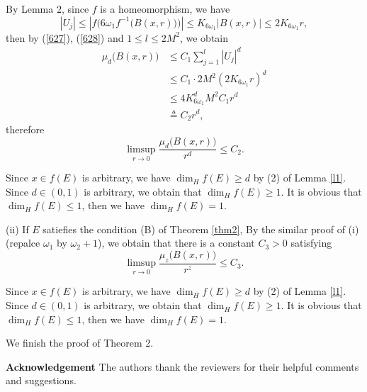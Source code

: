 \documentclass[reqno]{amsart}
\theoremstyle{plain}
\theoremstyle{definition}
\theoremstyle{remark}
\numberwithin{equation}{section} \DeclareMathOperator\intr{int}
\begin{document}
By  Lemma $2$, since $f$ is a homeomorphism, we have
\begin{equation}\label{628}
\left | U_j \right |\le \left | f\Big(6\omega_1 f^{-1}\big(B(x,r)\big)\Big) \right |\le K_{6\omega_1}\left | B(x,r) \right |\le 2K_{6\omega_1}r,
\end{equation}
then by (\ref{627}), (\ref{628}) and $1\le l \le 2M^2$, we obtain
\begin{equation}
\begin{aligned}
\mu_d\big(B(x,r)\big)&\le C_1\sum_{j = 1}^{l}\left | U_j \right |^d\\
&\le C_1 \cdot  2M^2(2K_{6\omega_1}r)^d\\
&\le 4K^d_{6\omega_1}M^2C_1r^d\\
&\triangleq C_2r^d,\nonumber
\end{aligned}
\end{equation}
therefore
$$\limsup\limits_{r \to 0}\frac{\mu_d\big(B(x,r)\big)}{r^d}\le C_2.$$

Since $x\in f(E)$ is arbitrary, we have $\dim_{H}f(E)\ge d$ by  (2) of Lemma \ref{l1}. Since $d\in(0,1)$ is arbitrary, we obtain that $\dim_H f(E)\ge 1$. It is obvious that $\dim_H f(E)\le 1$, then we have $\dim_{H}f(E)=1$.

(ii) If $E$ satiefies the condition {\rm(B)} of Theorem {\rm\ref{thm2}}, By the similar proof of (i)(repalce $\omega_1$ by $\omega_2+1$), we obtain that there is a constant $C_3>0$ satisfying
$$\limsup\limits_{r \to 0}\frac{\mu_z\big(B(x,r)\big)}{r^z}\le C_3.$$

Since $x\in f(E)$ is arbitrary, we have $\dim_{H}f(E)\ge d$ by  (2) of Lemma \ref{l1}. Since $d\in(0,1)$ is arbitrary, we obtain that $\dim_H f(E)\ge 1$. It is obvious that $\dim_H f(E)\le 1$, then we have $\dim_{H}f(E)=1$.



We finish the proof of Theorem 2.

\bigskip

\textbf{Acknowledgement} The authors thank the reviewers for their helpful comments and suggestions.





\bigskip

\end{document}
